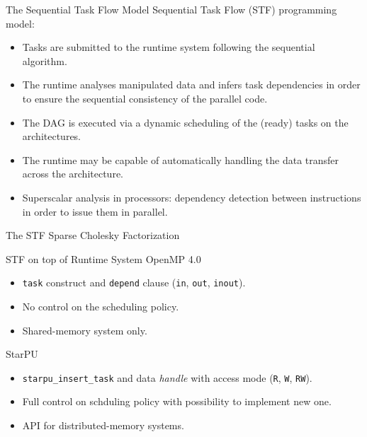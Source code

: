 \documentclass{beamer}
\newcommand{\db}[1]{\textcolor{mblue}{#1\xspace}}
\begin{document}
\begin{frame}{The Sequential Task Flow Model}  
  \alert{Sequential Task Flow} (STF) programming model:

  \begin{itemize}
  \item Tasks are submitted to the runtime system following the
    \db{sequential algorithm}.
  \item The runtime analyses manipulated data and infers task
    dependencies in order to ensure the \db{sequential consistency} of
    the parallel code.
  \item The DAG is executed via a \db{dynamic scheduling} of the
    (ready) tasks on the architectures.
  \item The runtime may be capable of automatically handling the data
    transfer across the architecture.
  \item \db{Superscalar analysis} in processors: dependency detection
    between instructions in order to issue them in parallel.
  \end{itemize} 
\end{frame}

\begin{frame}[fragile,t]{The STF Sparse Cholesky Factorization}
  \only<1>{}
\end{frame}

\begin{frame}{STF on top of Runtime System}
  \alert{OpenMP 4.0}
  \begin{itemize}
  \item \texttt{task} construct and \texttt{depend} clause (\texttt{in}, \texttt{out},
    \texttt{inout}).
  \item No control on the scheduling policy.
  \item Shared-memory system only.
  \end{itemize}

  \vspace{0.5cm}

  \alert{StarPU}
  \begin{itemize}
  \item \texttt{starpu\_insert\_task} and data \textit{handle} with
    access mode (\texttt{R}, \texttt{W}, \texttt{RW}).
  \item Full control on schduling policy with possibility to implement
    new one.
  \item API for distributed-memory systems.
  \end{itemize}  
\end{frame}
\end{document}
